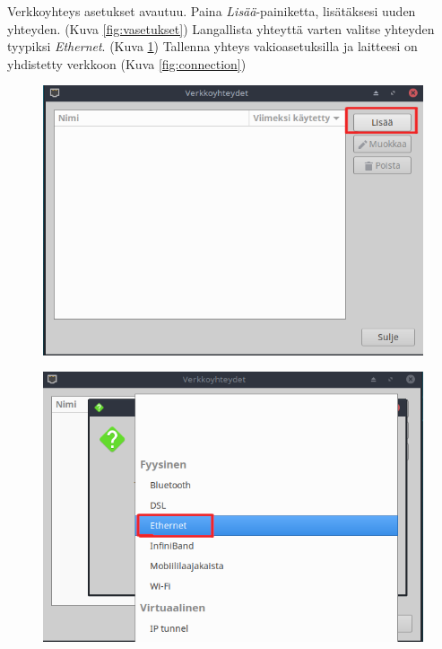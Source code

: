 \documentclass[a4paper, 12pt, finnish]{article}
\begin{document}
Verkkoyhteys asetukset avautuu. Paina \textit{Lisää}-painiketta, lisätäksesi uuden yhteyden. (Kuva \ref{fig:vasetukset}) Langallista yhteyttä varten valitse yhteyden tyypiksi \textit{Ethernet}. (Kuva \ref{fig:ethernet}) 
Tallenna yhteys vakioasetuksilla ja laitteesi on yhdistetty verkkoon (Kuva \ref{fig:connection})

\begin{figure}[htbp]
     \centering
      \begin{minipage}{.5\textwidth}
           \centering
            \includegraphics[width=.98\linewidth]{internet/lisaa_yhteys}
              \label{fig:vasetukset}
               \end{minipage}%
               \begin{minipage}{.5\textwidth}
                    \centering
                     \includegraphics[width=.98\linewidth]{internet/yhteys_ethernet}
                       \label{fig:ethernet}
                        \end{minipage}
                         \end{figure}
                         \clearpage
\end{document}
